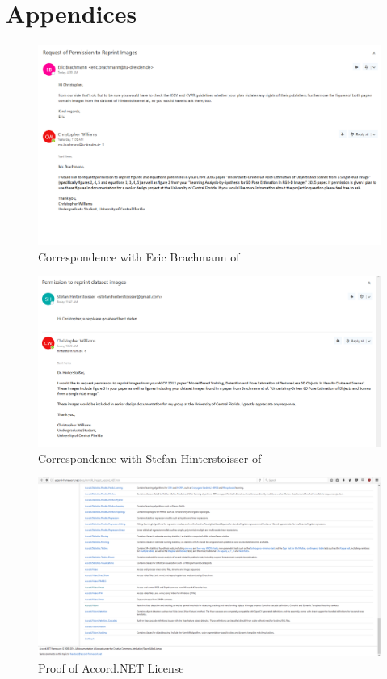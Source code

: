\documentclass[12pt]{article}
\begin{document}
\section{Appendices}\label{appendices}

\begin{figure}
\centering
\includegraphics{Pictures/brachmannPermission.png}
\caption{Correspondence with Eric Brachmann of \autocite{brachmann}}
\end{figure}

\begin{figure}
\centering
\includegraphics{Pictures/hinterstoisserPermission.png}
\caption{Correspondence with Stefan Hinterstoisser of
\autocite{hinterstoisser}}
\end{figure}

\begin{figure}
\centering
\includegraphics{Pictures/accordLicense.png}
\caption{Proof of Accord.NET License}
\end{figure}
\end{document}
